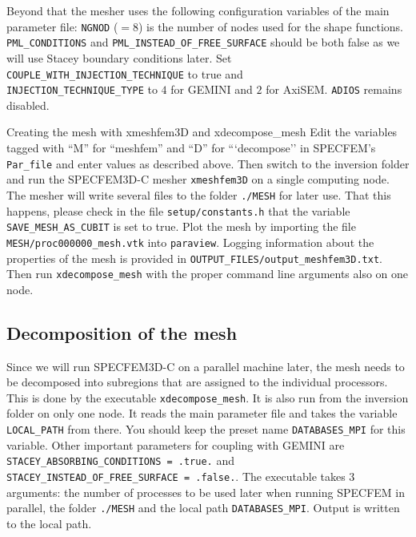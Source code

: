  Beyond that the mesher uses the following configuration variables of the main parameter file:
\verb+NGNOD+ ($=8$) is the number of nodes used for the shape functions. \verb+PML_CONDITIONS+ and \verb+PML_INSTEAD_OF_FREE_SURFACE+ should be both false as we will use Stacey boundary conditions later. Set \verb+COUPLE_WITH_INJECTION_TECHNIQUE+ to true and \\ \verb+INJECTION_TECHNIQUE_TYPE+ to $4$ for GEMINI and $2$ for AxiSEM. \verb+ADIOS+ remains disabled.
%
\begin{actionbox}[label={action:generate-mesh},float=h!]{Creating the mesh with xmeshfem3D and xdecompose\_mesh}
 Edit the variables tagged with ``M'' for ``meshfem'' and ``D'' for ```decompose'' in SPECFEM's \verb+Par_file+ and enter values as described above. Then switch to the inversion folder and run the SPECFEM3D-C mesher \verb+xmeshfem3D+ on a single computing node. The mesher will write several files to the folder \verb+./MESH+ for later use. That this happens, please check in the file \verb+setup/constants.h+ that the variable \verb+SAVE_MESH_AS_CUBIT+ is set to true.  Plot the mesh by importing the file \verb+MESH/proc000000_mesh.vtk+ into \verb+paraview+. Logging information about the properties of the mesh is provided in \verb+OUTPUT_FILES/output_meshfem3D.txt+. Then run \verb+xdecompose_mesh+ with the proper command line arguments also on one node.
\end{actionbox}
%
\subsection{Decomposition of the mesh}
%
Since we will run SPECFEM3D-C on a parallel machine later, the mesh needs to be decomposed into subregions that are assigned to the individual processors. This is done by the executable \verb+xdecompose_mesh+. It is also run from the inversion folder on only one node. It reads the main parameter file and takes the variable \verb+LOCAL_PATH+ from there. You should keep the preset name \verb+DATABASES_MPI+ for this variable. Other important parameters for coupling with GEMINI are \verb+STACEY_ABSORBING_CONDITIONS = .true.+ and \verb+STACEY_INSTEAD_OF_FREE_SURFACE = .false.+. The executable takes 3 arguments: the number of processes to be used later when running SPECFEM in parallel, the folder \verb+./MESH+ and the local path \verb+DATABASES_MPI+. Output is written to the local path.
%
